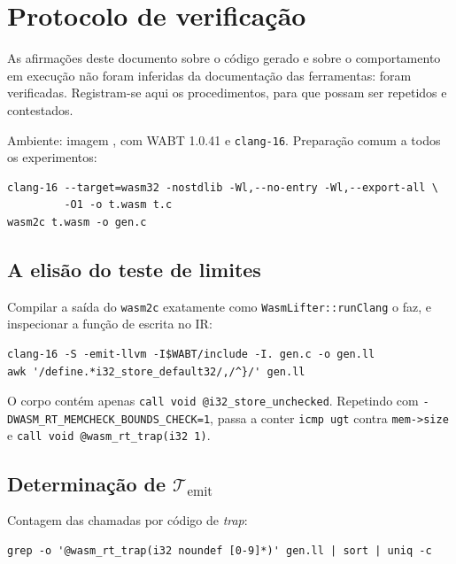 \documentclass[11pt,a4paper]{article}
\theoremstyle{definition}
\newcommand{\code}[1]{\texttt{#1}}
\begin{document}
\appendix
\section{Protocolo de verificação}
\label{ap:experimento}

As afirmações deste documento sobre o código gerado e sobre o comportamento em
execução não foram inferidas da documentação das ferramentas: foram verificadas.
Registram-se aqui os procedimentos, para que possam ser repetidos e contestados.

Ambiente: imagem , com WABT 1.0.41 e
\code{clang-16}. Preparação comum a todos os experimentos:

\begin{lstlisting}
clang-16 --target=wasm32 -nostdlib -Wl,--no-entry -Wl,--export-all \
         -O1 -o t.wasm t.c
wasm2c t.wasm -o gen.c
\end{lstlisting}

\subsection{A elisão do teste de limites}

Compilar a saída do \code{wasm2c} exatamente como \code{WasmLifter::runClang} o
faz, e inspecionar a função de escrita no IR:

\begin{lstlisting}
clang-16 -S -emit-llvm -I$WABT/include -I. gen.c -o gen.ll
awk '/define.*i32_store_default32/,/^}/' gen.ll
\end{lstlisting}

O corpo contém apenas \code{call void @i32\_store\_unchecked}. Repetindo com
\code{-DWASM\_RT\_MEMCHECK\_BOUNDS\_CHECK=1}, passa a conter \code{icmp ugt}
contra \code{mem->size} e \code{call void @wasm\_rt\_trap(i32 1)}.

\subsection{Determinação de \texorpdfstring{$\mathcal{T}_{\mathrm{emit}}$}{T-emit}}

Contagem das chamadas por código de \emph{trap}:

\begin{lstlisting}
grep -o '@wasm_rt_trap(i32 noundef [0-9]*)' gen.ll | sort | uniq -c
\end{lstlisting}
\end{document}
